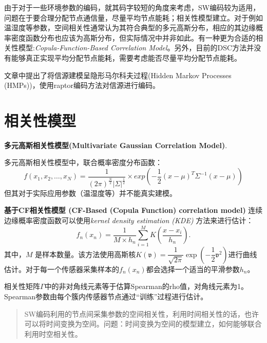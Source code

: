 由于对于一些环境参数的编码，就其码字较短的角度来考虑，SW编码较为适用，问题在于\textcolor[rgb]{1,0,0}{要合理分配节点通信量，尽量平均节点能耗；相关性模型建立}。对于例如温湿度等参数，空间相关性通常认为其符合典型的多元高斯分布，相应的其边缘概率密度函数分布也应该为高斯分布，但实际情况中并非如此。有一种更为合适的相关性模型:\emph{\textcolor[rgb]{1,0,0}{Copula-Function-Based Correlation Model}}。另外，目前的DSC方法并没有能够真正实现平均分配节点能耗，需要考虑能否尽量平均分配节点能耗。

文章\cite{Fresia2009}中提出了将信源建模呈隐形马尔科夫过程(Hidden Markov Processes (HMPs))，使用raptor编码方法对信源进行编码。

\section{相关性模型}
\textbf{多元高斯相关性模型(Multivariate Gaussian Correlation Model)}.

多元高斯相关性模型中，联合概率密度分布函数：
\begin{equation}
    f(x_1,x_2,\dots,x_N) = \dfrac{1}{(2\pi)^{\frac{N}{2}}|\Sigma|^{\frac{1}{2}}} \times exp\left( -\dfrac{1}{2} (x-\mu)^T \Sigma^{-1}(x-\mu) \right)
    \label{eq1.4}
\end{equation}
但其对于实际应用参数（温湿度等）并不能真实建模。

\textbf{基于CF相关性模型 (CF-Based (Copula Function) correlation model)}
连续边缘概率密度函数可以使用\emph{kernel density estimation (KDE)} 方法来进行估计：
\begin{equation}
    f_n(x_n) = \dfrac{1}{M \times h_n} \sum_{i=1}^{M}K\left( \dfrac{x-x_i}{h_n} \right).
    \label{eq1.11}
\end{equation}
其中，$M$ 是样本数量。该方法使用高斯核$K(\mathfrak{v}) = \dfrac{1}{\sqrt{2\pi}}\exp\left(-\dfrac{1}{2}\mathfrak{v}^2\right)$进行曲线估计。对于每一个传感器采集样本的$f_n(x_n)$都会选择一个适当的平滑参数$h_n$。

相关性矩阵$\Gamma$中的非对角线元素等于估算Spearman的rho值，对角线元素为1。Spearman参数由每个簇内传感器节点通过“训练”过程进行估计。

\begin{quotation}
    SW编码利用的节点间采集参数的空间相关性，利用时间相关性的话，也许可以将时间变换为空间。问题：时间变换为空间的模型建立，如何能够联合利用时空相关性。
\end{quotation}




